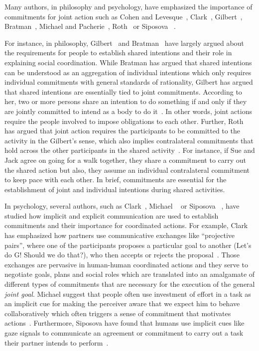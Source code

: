 \documentclass[a4paper,11pt,twoside]{StyleThese}
\begin{document}
Many authors, in philosophy and psychology, have emphasized the importance of commitments for joint action such as Cohen and Levesque~\cite{cohen_1991_teamwork}, Clark~\cite{clark_2006_social}, Gilbert~\cite{gilbert_2009_shared}, Bratman~\cite{bratman_2014_shared}, Michael and Pacherie~\cite{michael_2015_commitments}, Roth~\cite{roth_2014_shared} or Siposova \etal~\cite{siposova_2018_communicative}. 

For instance, in philosophy, Gilbert~\cite{gilbert_2009_shared} and Bratman~\cite{bratman_2014_shared} have largely argued about the requirements for people to establish shared intentions and their role in explaining social coordination. While Bratman has argued that shared intentions can be understood as an aggregation of individual intentions which only requires individual commitments with general standards of rationality, Gilbert has argued that shared intentions are essentially tied to joint commitments. According to her, two or more persons share an intention to do something if and only if they are jointly committed to intend as a body to do it~\cite{gilbert_2009_shared}. In other words, joint actions require the people involved to impose obligations to each other. Further, Roth has argued that joint action requires the participants to be committed to the activity in the Gilbert’s sense, which also implies contralateral commitments that hold across the other participants in the shared activity~\cite{roth_2014_shared}. For instance, if Sue and Jack agree on going for a walk together, they share a commitment to carry out the shared action but also, they assume an individual contralateral commitment to keep pace with each other. In brief, commitments are essential for the establishment of joint and individual intentions during shared activities. 

In psychology, several authors, such as Clark~\cite{clark_2006_social}, Michael \etal~\cite{michael2016} or Siposova \etal~\cite{siposova_2018_communicative}, have studied how implicit and explicit communication are used to establish commitments and their importance for coordinated actions. For example, Clark has emphasized how partners use communicative exchanges like ``projective pairs'', where one of the participants proposes a particular goal to another (Let’s do G! Should we do that?), who then accepts or rejects the proposal~\cite{clark_2006_social}. Those exchanges are pervasive in human-human coordinated actions and they serve to negotiate goals, plans and social roles which are translated into an amalgamate of different types of commitments that are necessary for the execution of the general \emph{joint goal}. Michael \etal{} suggest that people often use investment of effort in a task as an implicit cue for making the perceiver aware that we expect him to behave collaboratively which often triggers a sense of commitment that motivates actions~\cite{michael2016}. Furthermore, Siposova \etal{} have found that humans use implicit cues like gaze signals to communicate an agreement or commitment to carry out a task their partner intends to perform~\cite{siposova_2018_communicative}.
\end{document}
